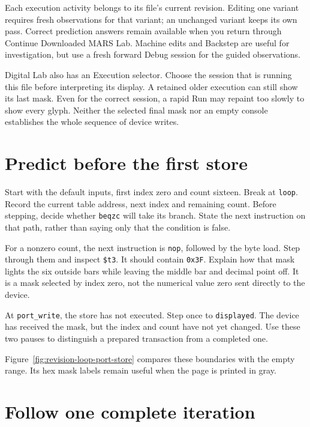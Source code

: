 Each execution activity belongs to its file's current revision. Editing one
variant requires fresh observations for that variant; an unchanged variant
keeps its own pass. Correct prediction answers remain available when you return
through Continue Downloaded MARS Lab. Machine edits and Backstep are useful for
investigation, but use a fresh forward Debug session for the guided observations.

Digital Lab also has an Execution selector. Choose the session that is running
this file before interpreting its display. A retained older execution can still
show its last mask. Even for the correct session, a rapid Run may repaint too
slowly to show every glyph. Neither the selected final mask nor an empty console
establishes the whole sequence of device writes.

\section{Predict before the first store}

Start with the default inputs, first index zero and count sixteen. Break at
\texttt{loop}. Record the current table address, next index and remaining count.
Before stepping, decide whether \texttt{beqzc} will take its branch. State the next
instruction on that path, rather than saying only that the condition is false.

For a nonzero count, the next instruction is \texttt{nop}, followed by the byte
load. Step through them and inspect \texttt{\$t3}. It should contain
\texttt{0x3F}. Explain how that mask lights the six outside bars while leaving the
middle bar and decimal point off. It is a mask selected by index zero, not the
numerical value zero sent directly to the device.

At \texttt{port\_write}, the store has not executed. Step once to
\texttt{displayed}. The device has received the mask, but the index and count
have not yet changed. Use these two pauses to distinguish a prepared transaction
from a completed one.

Figure~\ref{fig:revision-loop-port-store} compares these boundaries with the
empty range. Its hex mask labels remain useful when the page is printed in gray.



\section{Follow one complete iteration}

